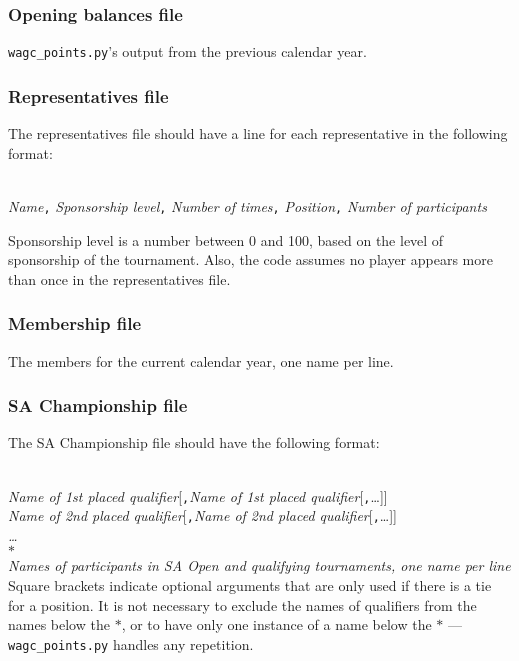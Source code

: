 \documentclass{article}
\begin{document}
\subsubsection{Opening balances file}
\texttt{wagc\_points.py}'s output from the previous calendar year.

\subsubsection{Representatives file}
The representatives file should have a line for each representative in the following format:

\noindent\\
\emph{\flq Name\frq}\texttt{,}
\emph{\flq Sponsorship level\frq}\texttt{,}
\emph{\flq Number of times\frq}\texttt{,}
\emph{\flq Position\frq}\texttt{,}
\emph{\flq Number of participants\frq}

Sponsorship level is a number between 0 and 100, based on the level of sponsorship of the tournament.  Also, the code assumes no
player appears more than once in the representatives file.

\subsubsection{Membership file}
The members for the current calendar year, one name per line.

\subsubsection{SA Championship file}
The SA Championship file should have the following format:

\noindent\\
\emph{\flq Name of 1st placed qualifier\frq}[\texttt{,}\emph{\flq Name of 1st placed qualifier\frq}[\texttt{,}\ldots]]\\
\emph{\flq Name of 2nd placed qualifier\frq}[\texttt{,}\emph{\flq Name of 2nd placed qualifier\frq}[\texttt{,}\ldots]]\\
\emph{\flq \ldots\frq}\\
$*$\\
\emph{\flq Names of participants in SA Open and qualifying tournaments, one name per line\frq}\\

Square brackets indicate optional arguments that are only used if there is a tie for a position. It is not necessary to 
exclude the names of qualifiers from the names below the $*$, or to have only one instance of a name below the $*$ --- 
\texttt{wagc\_points.py} handles any repetition.
\end{document}
